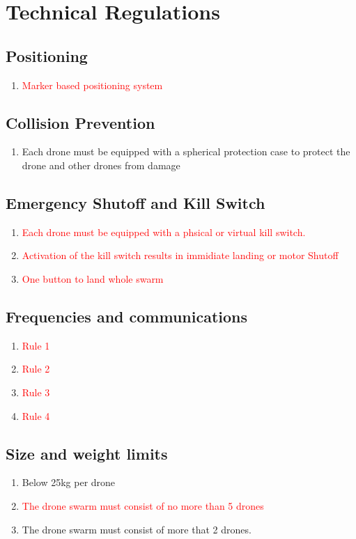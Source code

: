 \section{Technical Regulations}

\subsection{Positioning}
\begin{enumerate}
	\item{\textcolor{red}{Marker based positioning system}}

\end{enumerate}

\subsection{Collision Prevention}
\begin{enumerate}
	\item{Each drone must be equipped with a spherical protection case to protect the drone and other drones from damage}
\end{enumerate}

\subsection{Emergency Shutoff and Kill Switch}
\begin{enumerate}
	\item{\textcolor{red}{Each drone must be equipped with a phsical or virtual kill switch.}}
	\item{\textcolor{red}{Activation of the kill switch results in immidiate landing or motor Shutoff}}
	\item{\textcolor{red}{One button to land whole swarm}}
\end{enumerate}

\subsection{Frequencies and communications}
\begin{enumerate}
	\item{\textcolor{red}{Rule 1}}
	\item{\textcolor{red}{Rule 2}}
	\item{\textcolor{red}{Rule 3}}
	\item{\textcolor{red}{Rule 4}}
\end{enumerate}

\subsection{Size and weight limits}
\begin{enumerate}
	\item{Below 25kg per drone}
	\item{\textcolor{red}{The drone swarm must consist of no more than 5 drones}}
	\item{The drone swarm must consist of more that 2 drones.}
\end{enumerate}

